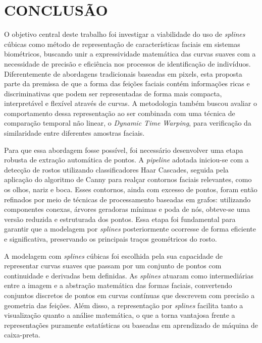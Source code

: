 \chapter{CONCLUSÃO} \label{cha:conclusao}

O objetivo central deste trabalho foi investigar a viabilidade do uso de \textit{splines} cúbicas como método de representação de características faciais em sistemas biométricos, buscando unir a expressividade matemática das curvas suaves com a necessidade de precisão e eficiência nos processos de identificação de indivíduos. Diferentemente de abordagens tradicionais baseadas em pixels, esta proposta parte da premissa de que a forma das feições faciais contém informações ricas e discriminativas que podem ser representadas de forma mais compacta, interpretável e flexível através de curvas. A metodologia também buscou avaliar o comportamento dessa representação ao ser combinada com uma técnica de comparação temporal não linear, o \textit{Dynamic Time Warping}, para verificação da similaridade entre diferentes amostras faciais.

Para que essa abordagem fosse possível, foi necessário desenvolver uma etapa robusta de extração automática de pontos. A \textit{pipeline} adotada iniciou-se com a detecção de rostos utilizando classificadores Haar Cascades, seguida pela aplicação do algoritmo de Canny para realçar contornos faciais relevantes, como os olhos, nariz e boca. Esses contornos, ainda com excesso de pontos, foram então refinados por meio de técnicas de processamento baseadas em grafos: utilizando componentes conexas, árvores geradoras mínimas e poda de nós, obteve-se uma versão reduzida e estruturada dos pontos. Essa etapa foi fundamental para garantir que a modelagem por \textit{splines} posteriormente ocorresse de forma eficiente e significativa, preservando os principais traços geométricos do rosto.

A modelagem com \textit{splines} cúbicas foi escolhida pela sua capacidade de representar curvas suaves que passam por um conjunto de pontos com continuidade e derivadas bem definidas. As \textit{splines} atuaram como intermediárias entre a imagem e a abstração matemática das formas faciais, convertendo conjuntos discretos de pontos em curvas contínuas que descrevem com precisão a geometria das feições. Além disso, a representação por \textit{splines} facilita tanto a visualização quanto a análise matemática, o que a torna vantajosa frente a representações puramente estatísticas ou baseadas em aprendizado de máquina de caixa-preta.




